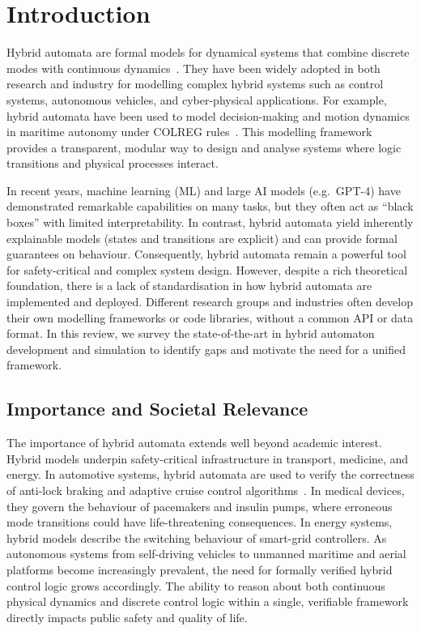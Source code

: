 \documentclass[a4paper, 12pt]{report}
\begin{document}
\section{Introduction}

Hybrid automata are formal models for dynamical systems that combine discrete
modes with continuous dynamics~\cite{Henzinger1996}.  They have been widely
adopted in both research and industry for modelling complex hybrid systems
such as control systems, autonomous vehicles, and cyber-physical
applications.  For example, hybrid automata have been used to model
decision-making and motion dynamics in maritime autonomy under COLREG
rules~\cite{imo2024colregs,SINGH2026123919}.  This modelling framework
provides a transparent, modular way to design and analyse systems where
logic transitions and physical processes interact.

In recent years, machine learning (ML) and large AI models (e.g.\ GPT-4)
have demonstrated remarkable capabilities on many tasks, but they often act
as ``black boxes'' with limited interpretability.  In contrast, hybrid
automata yield inherently explainable models (states and transitions are
explicit) and can provide formal guarantees on behaviour.  Consequently,
hybrid automata remain a powerful tool for safety-critical and complex
system design.  However, despite a rich theoretical foundation, there is a
lack of standardisation in how hybrid automata are implemented and deployed.
Different research groups and industries often develop their own modelling
frameworks or code libraries, without a common API or data format.  In this
review, we survey the state-of-the-art in hybrid automaton development and
simulation to identify gaps and motivate the need for a unified framework.

\subsection*{Importance and Societal Relevance}

The importance of hybrid automata extends well beyond academic interest.
Hybrid models underpin safety-critical infrastructure in transport,
medicine, and energy.  In automotive systems, hybrid automata are used to
verify the correctness of anti-lock braking and adaptive cruise control
algorithms~\cite{Althoff2010CORA}.  In medical devices, they govern the
behaviour of pacemakers and insulin pumps, where erroneous mode transitions
could have life-threatening consequences.  In energy systems, hybrid models
describe the switching behaviour of smart-grid controllers.  As autonomous
systems from self-driving vehicles to unmanned maritime and aerial
platforms become increasingly prevalent, the need for formally verified
hybrid control logic grows accordingly.  The ability to reason about both
continuous physical dynamics and discrete control logic within a single,
verifiable framework directly impacts public safety and quality of life.
\end{document}
